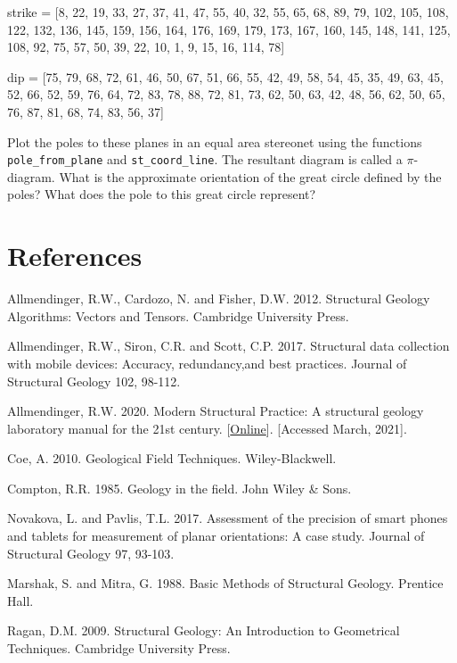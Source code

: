 \documentclass[a4paper , 12pt]{book}
\newcommand{\code}[1]{\colorbox{light-gray}{\texttt{#1}}}
\begin{document}
\begin{enumerate}
  strike = [8, 22, 19, 33, 27, 37, 41, 47, 55, 40, 32, 55, 65, 68, 89, 79, 102, 105, 108, 122, 132, 136, 145, 159, 156, 164, 176, 169, 179, 173, 167, 160, 145, 148, 141, 125, 108, 92, 75, 57, 50, 39, 22, 10, 1, 9, 15, 16, 114, 78]
  
  dip = [75, 79, 68, 72, 61, 46, 50, 67, 51, 66, 55, 42, 49, 58, 54, 45, 35, 49, 63, 45, 52, 66, 52, 59, 76, 64, 72, 83, 78, 88, 72, 81, 73, 62, 50, 63, 42, 48, 56, 62, 50, 65, 76, 87, 81, 68, 74, 83, 56, 37]
  
  Plot the poles to these planes in an equal area stereonet using the functions \code{pole\_from\_plane} and \code{st\_coord\_line}. The resultant diagram is called a $\pi$- diagram. What is the approximate orientation of the great circle defined by the poles? What does the pole to this great circle represent? 
  
\end{enumerate}

\section*{References}

Allmendinger, R.W., Cardozo, N. and Fisher, D.W. 2012. Structural Geology Algorithms: Vectors and Tensors. Cambridge University Press.

Allmendinger, R.W., Siron, C.R. and Scott, C.P. 2017. Structural data collection with mobile devices: Accuracy, redundancy,and best practices. Journal of Structural Geology 102, 98-112.

Allmendinger, R.W. 2020. Modern Structural Practice: A structural geology laboratory manual for the 21st century. [\href{https://www.rickallmendinger.net/download}{Online}]. [Accessed March, 2021].

Coe, A. 2010. Geological Field Techniques. Wiley-Blackwell.

Compton, R.R. 1985. Geology in the field. John Wiley \& Sons.

Novakova, L. and Pavlis, T.L. 2017. Assessment of the precision of smart phones and tablets for measurement of planar orientations: A case study. Journal of Structural Geology 97, 93-103.

Marshak, S. and Mitra, G. 1988. Basic Methods of Structural Geology. Prentice Hall.

Ragan, D.M. 2009. Structural Geology: An Introduction to Geometrical Techniques. Cambridge University Press.
\end{document}
